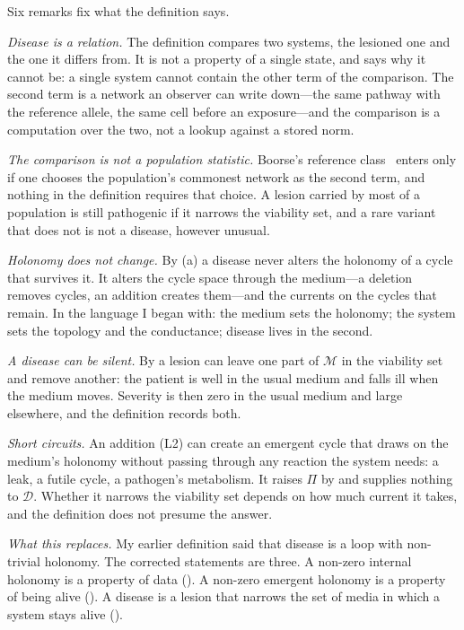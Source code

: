 Six remarks fix what the definition says.

\emph{Disease is a relation.} The definition compares two systems, the
lesioned one and the one it differs from. It is not a property of a single
state, and  says why it cannot be: a single system
cannot contain the other term of the comparison. The second term is a
network an observer can write down---the same pathway with the reference
allele, the same cell before an exposure---and the comparison is a
computation over the two, not a lookup against a stored norm.

\emph{The comparison is not a population statistic.} Boorse's reference
class~\citep{boorse1977} enters only if one chooses the population's
commonest network as the second term, and nothing in the definition
requires that choice. A lesion carried by most of a population is still
pathogenic if it narrows the viability set, and a rare variant that does not
is not a disease, however unusual.

\emph{Holonomy does not change.} By (a) a disease never
alters the holonomy of a cycle that survives it. It alters the cycle space
through the medium---a deletion removes cycles, an addition creates
them---and the currents on the cycles that remain. In the language I began
with: the medium sets the holonomy; the system sets the topology and the
conductance; disease lives in the second.

\emph{A disease can be silent.} By  a lesion can leave
one part of $\mathcal M$ in the viability set and remove another: the
patient is well in the usual medium and falls ill when the medium moves.
Severity is then zero in the usual medium and large elsewhere, and the
definition records both.

\emph{Short circuits.} An addition (L2) can create an emergent cycle that
draws on the medium's holonomy without passing through any reaction the
system needs: a leak, a futile cycle, a pathogen's metabolism. It raises
$\Pi$ by  and supplies nothing to $\mathcal D$. Whether
it narrows the viability set depends on how much current it takes, and the
definition does not presume the answer.

\emph{What this replaces.} My earlier definition said that disease is a loop
with non-trivial holonomy. The corrected statements are three. A non-zero
internal holonomy is a property of data (). A
non-zero emergent holonomy is a property of being alive
(). A disease is a lesion that narrows the set of
media in which a system stays alive ().

